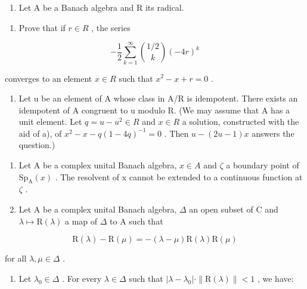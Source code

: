 \begin{enumerate}
\def\labelenumi{¶ \arabic{enumi})}
\setcounter{enumi}{25}
\tightlist
\item
  Let A be a Banach algebra and R its radical.
\end{enumerate}

\begin{enumerate}
\def\labelenumi{\alph{enumi})}
\tightlist
\item
  Prove that if \(r \in R\) , the series
\end{enumerate}

\[
- \frac {1}{2} \sum_ {k = 1} ^ {\infty} \binom{1 / 2}{k} (- 4 r) ^ {k}
\]

converges to an element \(x \in R\) such that \(x^{2} - x + r = 0\) .

\begin{enumerate}
\def\labelenumi{\alph{enumi})}
\setcounter{enumi}{1}
\tightlist
\item
  Let u be an element of A whose class in A/R is idempotent. There exists an idempotent of A congruent to u modulo R. (We may assume that A has a unit element. Let \(q = u - u^{2} \in R\) and \(x \in R\) a solution, constructed with the aid of a), of \(x^{2} - x - q(1 - 4q)^{-1} = 0\) . Then \(u - (2u - 1)x\) answers the question.)
\end{enumerate}

\begin{enumerate}
\def\labelenumi{\arabic{enumi})}
\setcounter{enumi}{26}
\item
  Let A be a complex unital Banach algebra, \(x \in A\) and \(\zeta\) a boundary point of \(\mathrm{Sp}_{\mathrm{A}}(x)\) . The resolvent of x cannot be extended to a continuous function at \(\zeta\) .
\item
  Let A be a complex unital Banach algebra, \(\Delta\) an open subset of C and \(\lambda \mapsto \mathrm{R}(\lambda)\) a map of \(\Delta\) to A such that
\end{enumerate}

\[
\mathrm{R} (\lambda) - \mathrm{R} (\mu) = - (\lambda - \mu) \mathrm{R} (\lambda) \mathrm{R} (\mu)\tag{5}
\]

for all \(\lambda,\mu\in\Delta\) .

\begin{enumerate}
\def\labelenumi{\alph{enumi})}
\tightlist
\item
  Let \(\lambda_0\in \Delta\) . For every \(\lambda \in \Delta\) such that \(|\lambda -\lambda_0|\cdot \| \mathrm{R}(\lambda)\| <  1\) , we have:
\end{enumerate}


